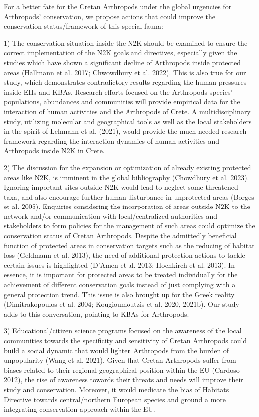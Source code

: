 For a better fate for the Cretan Arthropods under the global urgencies for
Arthropods’ conservation, we propose actions that could improve the
conservation status/framework of this special fauna:

1) The conservation situation inside the N2K should be examined to ensure the
correct implementation of the N2K goals and directives, especially given the
studies which have shown a significant decline of Arthropods inside protected
areas (Hallmann et al. 2017; Chwowdhury et al. 2022). This is also true for our
study, which demonstrates contradictory results regarding the human pressures
inside EHs and KBAs. Research efforts focused on the Arthropods species’
populations, abundances and communities will provide empirical data for the
interaction of human activities and the Arthropods of Crete. A multidisciplinary
study, utilizing molecular and geographical tools as well as the local
stakeholders in the spirit of Lehmann et al. (2021), would provide the much
needed research framework regarding the interaction dynamics of human activities
and Arthropods inside N2K in Crete.

2) The discussion for the expansion or optimization of already existing
protected areas like N2K, is imminent in the global bibliography (Chowdhury et al. 2023).
Ignoring important sites outside N2K would lead to neglect some threatened taxa,
and also encourage further human disturbance in unprotected areas (Borges et al. 2005).
Enquiries considering the incorporation of areas outside N2K to the network
and/or communication with local/centralized authorities and stakeholders to
form policies for the management of such areas could optimize the conservation
status of Cretan Arthropods. Despite the admittedly beneficial function of
protected areas in conservation targets such as the reducing of habitat loss (Geldmann et al. 2013),
the need of additional protection actions to tackle certain issues is highlighted (D’Amen et al. 2013; Hochkirch et al. 2013).
In essence, it is important for protected areas to be treated individually for
the achievement of different conservation goals instead of just complying with
a general protection trend. This issue is also brought up for the Greek reality (Dimitrakopoulos et al. 2004; Kougioumoutzis et al. 2020, 2021b).
Our study adds to this conversation, pointing to KBAs for Arthropods.

3) Educational/citizen science programs focused on the awareness of the local
communities towards the specificity and sensitivity of Cretan Arthropods could
build a social dynamic that would lighten Arthropods from the burden of
unpopularity (Wang et al. 2021). Given that Cretan Arthropods suffer from
biases related to their regional geographical position within the EU (Cardoso 2012),
the rise of awareness towards their threats and needs will improve their study
and conservation. Moreover, it would medicate the bias of Habitats Directive
towards central/northern European species and ground a more integrating
conservation approach within the EU.

